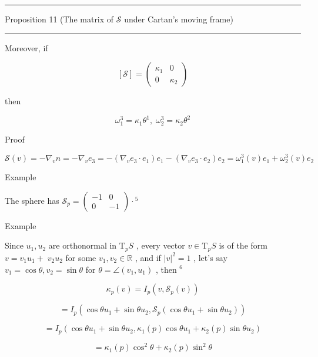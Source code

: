 \documentclass[lang=cn,a4paper,11pt,openany,twoside]{elegantbook}
\newcommand{\HRule}{\begin{center}\rule{0.9\linewidth}{0.2mm}\end{center}}
\begin{document}
\HRule

Proposition 11 (The matrix of \(\mathcal{S}\) under Cartan's moving frame)

\HRule

Moreover, if

\[
\left\lbrack  \mathcal{S}\right\rbrack   = \left( \begin{matrix} {\kappa }_{1} & 0 \\  0 & {\kappa }_{2} \end{matrix}\right)
\]

then

\[
{\omega }_{1}^{3} = {\kappa }_{1}{\theta }^{1},\;{\omega }_{2}^{3} = {\kappa }_{2}{\theta }^{2}
\]

Proof

\[
\mathcal{S}\left( v\right)  =  - {\nabla }_{v}n =  - {\nabla }_{v}{e}_{3} =  - \left( {{\nabla }_{v}{e}_{3} \cdot  {e}_{1}}\right) {e}_{1} - \left( {{\nabla }_{v}{e}_{3} \cdot  {e}_{2}}\right) {e}_{2} = {\omega }_{1}^{3}\left( v\right) {e}_{1} + {\omega }_{2}^{3}\left( v\right) {e}_{2}
\]

Example

The sphere has \({\mathcal{S}}_{p} = \left( \begin{matrix}  - 1 & 0 \\  0 &  - 1 \end{matrix}\right)  \cdot  {}^{5}\)

Example

Since \({u}_{1},{u}_{2}\) are orthonormal in \({\mathrm{T}}_{p}S\) , every vector \(v \in  {\mathrm{T}}_{p}S\) is of the form \(v = {v}_{1}{u}_{1} + \; {v}_{2}{u}_{2}\) for some \({v}_{1},{v}_{2} \in  \mathbb{R}\) , and if \({\left| v\right| }^{2} = 1\) , let’s say \({v}_{1} = \cos \theta ,{v}_{2} = \sin \theta\) for \(\theta  = \angle \left( {{v}_{1},{u}_{1}}\right)\) , then \({}^{6}\)

\[
{\kappa }_{p}\left( v\right)  = {I}_{p}\left( {v,{\mathcal{S}}_{p}\left( v\right) }\right)
\]

\[
= {I}_{p}\left( {\cos \theta {u}_{1} + \sin \theta {u}_{2},{\mathcal{S}}_{p}\left( {\cos \theta {u}_{1} + \sin \theta {u}_{2}}\right) }\right)
\]

\[
= {I}_{p}\left( {\cos \theta {u}_{1} + \sin \theta {u}_{2},{\kappa }_{1}\left( p\right) \cos \theta {u}_{1} + {\kappa }_{2}\left( p\right) \sin \theta {u}_{2}}\right)
\]

\[
= {\kappa }_{1}\left( p\right) {\cos }^{2}\theta  + {\kappa }_{2}\left( p\right) {\sin }^{2}\theta
\]
\end{document}
